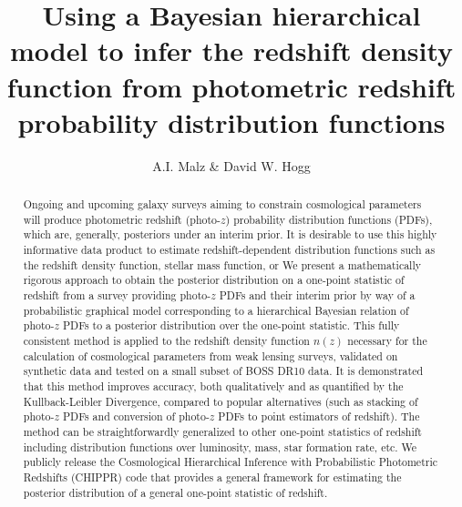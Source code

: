 \documentclass[iop]{emulateapj}
\begin{document}
\title{Using a Bayesian hierarchical model to infer the redshift density function from photometric redshift probability distribution functions}

\author{A.I. Malz \& David W. Hogg %
}


\begin{abstract}
Ongoing and upcoming galaxy surveys aiming to constrain cosmological parameters will produce photometric redshift (photo-$z$) probability distribution functions (PDFs), which are, generally, posteriors under an interim prior.  It is desirable to use this highly informative data product to estimate redshift-dependent distribution functions such as the redshift density function, stellar mass function, or We present a mathematically rigorous approach to obtain the posterior distribution on a one-point statistic of redshift from a survey providing photo-$z$ PDFs and their interim prior by way of a probabilistic graphical model corresponding to a hierarchical Bayesian relation of photo-$z$ PDFs to a posterior distribution over the one-point statistic.  This fully consistent method is applied to the redshift density function $n(z)$ necessary for the calculation of cosmological parameters from weak lensing surveys, validated on synthetic data and tested on a small subset of BOSS DR10 data.  It is demonstrated that this method improves accuracy, both qualitatively and as quantified by the Kullback-Leibler Divergence, compared to popular alternatives (such as stacking of photo-$z$ PDFs and conversion of photo-$z$ PDFs to point estimators of redshift).  The method can be straightforwardly generalized to other one-point statistics of redshift including distribution functions over luminosity, mass, star formation rate, etc.  We publicly release the Cosmological Hierarchical Inference with Probabilistic Photometric Redshifts (CHIPPR) code that provides a general framework for estimating the posterior distribution of a general one-point statistic of redshift.
\end{abstract}
\end{document}
